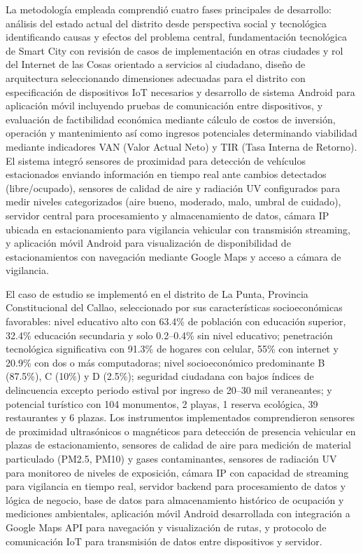 \documentclass[12pt,a4paper]{article}
\begin{document}
La metodología empleada comprendió cuatro fases principales de desarrollo: análisis del estado actual del distrito desde perspectiva social y tecnológica identificando causas y efectos del problema central, fundamentación tecnológica de Smart City con revisión de casos de implementación en otras ciudades y rol del Internet de las Cosas orientado a servicios al ciudadano, diseño de arquitectura seleccionando dimensiones adecuadas para el distrito con especificación de dispositivos IoT necesarios y desarrollo de sistema Android para aplicación móvil incluyendo pruebas de comunicación entre dispositivos, y evaluación de factibilidad económica mediante cálculo de costos de inversión, operación y mantenimiento así como ingresos potenciales determinando viabilidad mediante indicadores VAN (Valor Actual Neto) y TIR (Tasa Interna de Retorno). El sistema integró sensores de proximidad para detección de vehículos estacionados enviando información en tiempo real ante cambios detectados (libre/ocupado), sensores de calidad de aire y radiación UV configurados para medir niveles categorizados (aire bueno, moderado, malo, umbral de cuidado), servidor central para procesamiento y almacenamiento de datos, cámara IP ubicada en estacionamiento para vigilancia vehicular con transmisión streaming, y aplicación móvil Android para visualización de disponibilidad de estacionamientos con navegación mediante Google Maps y acceso a cámara de vigilancia.

El caso de estudio se implementó en el distrito de La Punta, Provincia Constitucional del Callao, seleccionado por sus características socioeconómicas favorables: nivel educativo alto con 63.4\% de población con educación superior, 32.4\% educación secundaria y solo 0.2--0.4\% sin nivel educativo; penetración tecnológica significativa con 91.3\% de hogares con celular, 55\% con internet y 20.9\% con dos o más computadoras; nivel socioeconómico predominante B (87.5\%), C (10\%) y D (2.5\%); seguridad ciudadana con bajos índices de delincuencia excepto periodo estival por ingreso de 20--30 mil veraneantes; y potencial turístico con 104 monumentos, 2 playas, 1 reserva ecológica, 39 restaurantes y 6 plazas. Los instrumentos implementados comprendieron sensores de proximidad ultrasónicos o magnéticos para detección de presencia vehicular en plazas de estacionamiento, sensores de calidad de aire para medición de material particulado (PM2.5, PM10) y gases contaminantes, sensores de radiación UV para monitoreo de niveles de exposición, cámara IP con capacidad de streaming para vigilancia en tiempo real, servidor backend para procesamiento de datos y lógica de negocio, base de datos para almacenamiento histórico de ocupación y mediciones ambientales, aplicación móvil Android desarrollada con integración a Google Maps API para navegación y visualización de rutas, y protocolo de comunicación IoT para transmisión de datos entre dispositivos y servidor.
\end{document}
